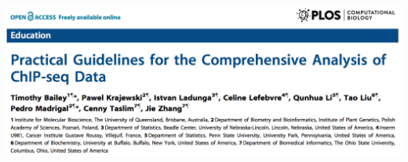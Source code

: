 \documentclass{beamer}
\begin{document}
\begin{frame}
\includegraphics[width=\linewidth]{paperChipSeq.png}
\end{frame}

\begin{frame}
\end{frame}
\end{document}
